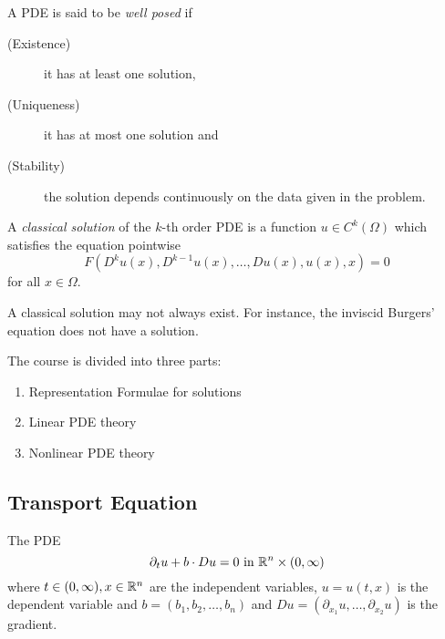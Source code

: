 \begin{definition}
    A PDE is said to be \textit{well posed} if
    \begin{description}
	\item[(Existence)] it has at least one solution,
	\item[(Uniqueness)] it has at most one solution and
	\item[(Stability)] the solution depends continuously on the data given in the problem.
    \end{description}
    \label{def:well-posed}
\end{definition}

\begin{definition}
    A \textit{classical solution} of the $k$-th order PDE is a function $u\in C^k (\Omega)$ which satisfies the equation pointwise
    $$F\left( D^k u(x) , D^{k-1} u(x), \ldots , Du(x), u(x),x \right) =0$$
    for all $x\in \Omega$.
    \label{def:classical-solution}
\end{definition}

\begin{remark}
    A classical solution may not always exist. For instance, the inviscid Burgers' equation does not have a solution.
\end{remark}

The course is divided into three parts:
\begin{enumerate}[label=(\alph*)]
    \item Representation Formulae for solutions
    \item Linear PDE theory
    \item Nonlinear PDE theory
\end{enumerate}



\subsection{Transport Equation}

The PDE
\begin{equation*}
    \partial_t u + b \cdot Du = 0 \text{ in } \mathbb R ^n \times (0, \infty)
\end{equation*}
where $t\in (0, \infty ), x\in \mathbb R ^n$ are the independent variables, $u=u(t,x)$ is the dependent variable and $b=\left( b_1 ,b_2 , \ldots , b_n \right)$ and $Du = \left( \partial _ {x_1} u , \ldots , \partial _{x_2} u \right)$ is the gradient.

